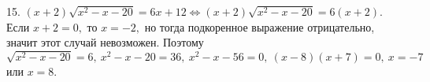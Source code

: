15. $(x+2)\sqrt{x^2-x-20}=6x+12\Leftrightarrow (x+2)\sqrt{x^2-x-20}=6(x+2).$ Если $x+2=0,$ то $x=-2,$ но тогда подкоренное выражение отрицательно, значит этот случай невозможен. Поэтому $\sqrt{x^2-x-20}=6,\ x^2-x-20=36,\ x^2-x-56=0,\ (x-8)(x+7)=0,\ x=-7$ или $x=8.$\\
